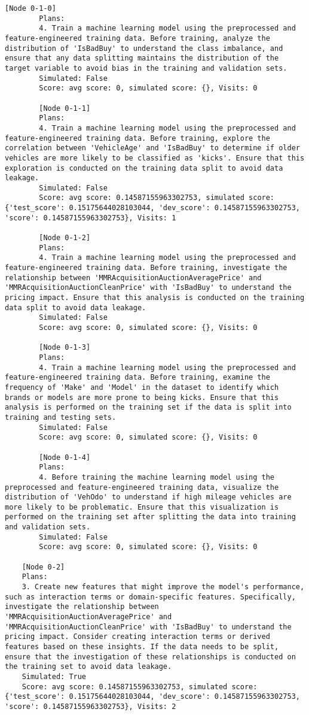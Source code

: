 \begin{lstlisting}[style=txtfile]
		[Node 0-1-0]
		Plans: 
		4. Train a machine learning model using the preprocessed and feature-engineered training data. Before training, analyze the distribution of 'IsBadBuy' to understand the class imbalance, and ensure that any data splitting maintains the distribution of the target variable to avoid bias in the training and validation sets.
		Simulated: False
		Score: avg score: 0, simulated score: {}, Visits: 0

		[Node 0-1-1]
		Plans: 
		4. Train a machine learning model using the preprocessed and feature-engineered training data. Before training, explore the correlation between 'VehicleAge' and 'IsBadBuy' to determine if older vehicles are more likely to be classified as 'kicks'. Ensure that this exploration is conducted on the training data split to avoid data leakage.
		Simulated: False
		Score: avg score: 0.14587155963302753, simulated score: {'test_score': 0.15175644028103044, 'dev_score': 0.14587155963302753, 'score': 0.14587155963302753}, Visits: 1

		[Node 0-1-2]
		Plans: 
		4. Train a machine learning model using the preprocessed and feature-engineered training data. Before training, investigate the relationship between 'MMRAcquisitionAuctionAveragePrice' and 'MMRAcquisitionAuctionCleanPrice' with 'IsBadBuy' to understand the pricing impact. Ensure that this analysis is conducted on the training data split to avoid data leakage.
		Simulated: False
		Score: avg score: 0, simulated score: {}, Visits: 0

		[Node 0-1-3]
		Plans: 
		4. Train a machine learning model using the preprocessed and feature-engineered training data. Before training, examine the frequency of 'Make' and 'Model' in the dataset to identify which brands or models are more prone to being kicks. Ensure that this analysis is performed on the training set if the data is split into training and testing sets.
		Simulated: False
		Score: avg score: 0, simulated score: {}, Visits: 0

		[Node 0-1-4]
		Plans: 
		4. Before training the machine learning model using the preprocessed and feature-engineered training data, visualize the distribution of 'VehOdo' to understand if high mileage vehicles are more likely to be problematic. Ensure that this visualization is performed on the training set after splitting the data into training and validation sets.
		Simulated: False
		Score: avg score: 0, simulated score: {}, Visits: 0

	[Node 0-2]
	Plans: 
	3. Create new features that might improve the model's performance, such as interaction terms or domain-specific features. Specifically, investigate the relationship between 'MMRAcquisitionAuctionAveragePrice' and 'MMRAcquisitionAuctionCleanPrice' with 'IsBadBuy' to understand the pricing impact. Consider creating interaction terms or derived features based on these insights. If the data needs to be split, ensure that the investigation of these relationships is conducted on the training set to avoid data leakage.
	Simulated: True
	Score: avg score: 0.14587155963302753, simulated score: {'test_score': 0.15175644028103044, 'dev_score': 0.14587155963302753, 'score': 0.14587155963302753}, Visits: 2


\end{lstlisting}
